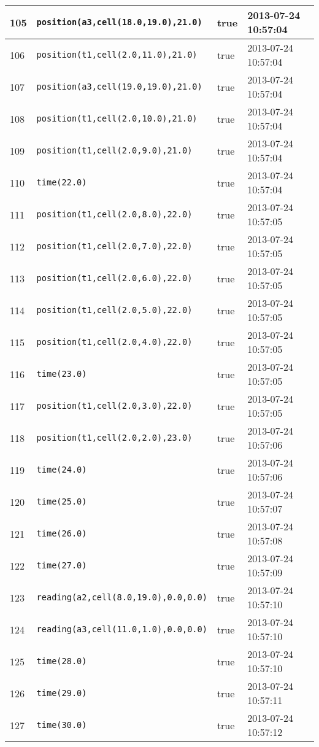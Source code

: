 \documentclass[11pt]{article}\usepackage[utf8]{inputenc}\usepackage{geometry}
\begin{document}
\begin{table}[ht]
\begin{tabular}{l l l l}
105&\texttt{position(a3,cell(18.0,19.0),21.0)}&true&2013-07-24 10:57:04\\ [1ex] \hline
106&\texttt{position(t1,cell(2.0,11.0),21.0)}&true&2013-07-24 10:57:04\\ [1ex] \hline
107&\texttt{position(a3,cell(19.0,19.0),21.0)}&true&2013-07-24 10:57:04\\ [1ex] \hline
108&\texttt{position(t1,cell(2.0,10.0),21.0)}&true&2013-07-24 10:57:04\\ [1ex] \hline
109&\texttt{position(t1,cell(2.0,9.0),21.0)}&true&2013-07-24 10:57:04\\ [1ex] \hline
110&\texttt{time(22.0)}&true&2013-07-24 10:57:04\\ [1ex] \hline
111&\texttt{position(t1,cell(2.0,8.0),22.0)}&true&2013-07-24 10:57:05\\ [1ex] \hline
112&\texttt{position(t1,cell(2.0,7.0),22.0)}&true&2013-07-24 10:57:05\\ [1ex] \hline
113&\texttt{position(t1,cell(2.0,6.0),22.0)}&true&2013-07-24 10:57:05\\ [1ex] \hline
114&\texttt{position(t1,cell(2.0,5.0),22.0)}&true&2013-07-24 10:57:05\\ [1ex] \hline
115&\texttt{position(t1,cell(2.0,4.0),22.0)}&true&2013-07-24 10:57:05\\ [1ex] \hline
116&\texttt{time(23.0)}&true&2013-07-24 10:57:05\\ [1ex] \hline
117&\texttt{position(t1,cell(2.0,3.0),22.0)}&true&2013-07-24 10:57:05\\ [1ex] \hline
118&\texttt{position(t1,cell(2.0,2.0),23.0)}&true&2013-07-24 10:57:06\\ [1ex] \hline
119&\texttt{time(24.0)}&true&2013-07-24 10:57:06\\ [1ex] \hline
120&\texttt{time(25.0)}&true&2013-07-24 10:57:07\\ [1ex] \hline
121&\texttt{time(26.0)}&true&2013-07-24 10:57:08\\ [1ex] \hline
122&\texttt{time(27.0)}&true&2013-07-24 10:57:09\\ [1ex] \hline
123&\texttt{reading(a2,cell(8.0,19.0),0.0,0.0)}&true&2013-07-24 10:57:10\\ [1ex] \hline
124&\texttt{reading(a3,cell(11.0,1.0),0.0,0.0)}&true&2013-07-24 10:57:10\\ [1ex] \hline
125&\texttt{time(28.0)}&true&2013-07-24 10:57:10\\ [1ex] \hline
126&\texttt{time(29.0)}&true&2013-07-24 10:57:11\\ [1ex] \hline
127&\texttt{time(30.0)}&true&2013-07-24 10:57:12\\ [1ex] \hline

\end{tabular}
\end{table}
\end{document}
